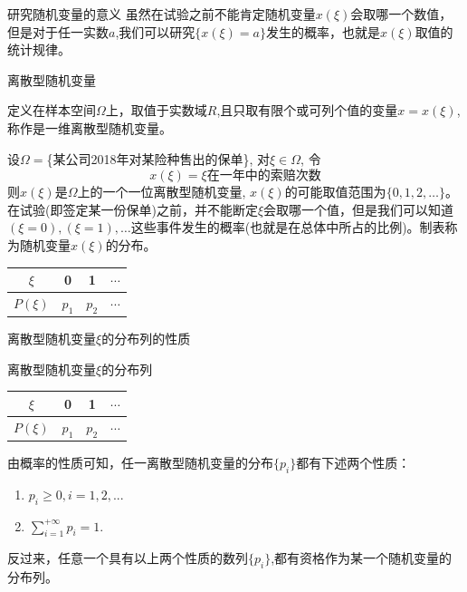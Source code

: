\begin{frame}{研究随机变量的意义}
  虽然在试验之前不能肯定随机变量$x(\xi)$会取哪一个数值，但是对于任一实数$a$,我们可以研究$\{x(\xi)=a\}$发生的概率，也就是$x(\xi)$取值的统计规律。
\end{frame}
\begin{frame}{离散型随机变量}
	\begin{definition}
		定义在样本空间$\Omega$上，取值于实数域$R$,且只取有限个或可列个值的变量$x=x(\xi)$, 称作是一维离散型随机变量。
	\end{definition}
	\begin{example}
		设$\Omega=$\{某公司2018年对某险种售出的保单\}, 对$\xi\in\Omega$, 令
		\[x(\xi)=\xi\text{在一年中的索赔次数}\]
		则$x(\xi)$是$\Omega$上的一个一位离散型随机变量, $x(\xi)$的可能取值范围为$\{0,1,2,\dots\}$。 在试验(即签定某一份保单)之前，并不能断定$\xi$会取哪一个值，但是我们可以知道$(\xi=0),(\xi=1),\dots$这些事件发生的概率(也就是在总体中所占的比例)。制表称为随机变量$x(\xi)$的分布。
		\begin{tabular}{|c|c|c|c|}
			\hline 
			$\xi$ & 0 & 1 & $\cdots$\\ 
			\hline 
			$P(\xi)$ & $p_1$ & $p_2$ & $\cdots$\\ 
			\hline 
		\end{tabular} 
	\end{example}
\end{frame}

\begin{frame}{离散型随机变量$\xi$的分布列的性质}
\begin{block}{离散型随机变量$\xi$的分布列}
	\begin{tabular}{|c|c|c|c|}
		\hline 
		$\xi$ & 0 & 1 & $\cdots$\\ 
		\hline 
		$P(\xi)$ & $p_1$ & $p_2$ & $\cdots$\\ 
		\hline 
	\end{tabular} 
\end{block}

由概率的性质可知，任一离散型随机变量的分布$\{p_i\}$都有下述两个性质：
\begin{enumerate}
	\item $p_i\ge 0,i=1,2,...$
	\item $\sum_{i=1}^{+\infty}{p_i}=1$.
\end{enumerate}
反过来，任意一个具有以上两个性质的数列$\{p_i\}$,都有资格作为某一个随机变量的分布列。
\end{frame}


